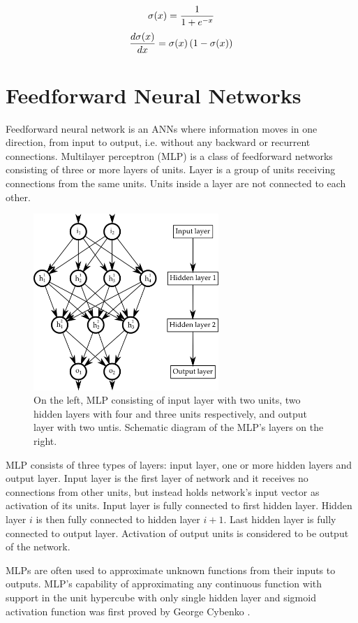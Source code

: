 \documentclass[12pt,oneside]{fithesis2}
\begin{document}
$$\sigma(x) = {1 \over {1 + e^{-x}}}$$
$${{d\sigma(x)} \over dx} = \sigma(x)  \left(1 - \sigma(x)\right)$$

\section{Feedforward Neural Networks}
Feedforward neural network is an ANNs where information moves in one direction, from input to output, i.e. without any backward or recurrent connections. Multilayer perceptron (MLP) is a class of feedforward networks consisting of three or more layers of units. Layer is a group of units receiving connections from the same units. Units inside a layer are not connected to each other. \par
	\begin{figure}[ht]
		\centering
		\includegraphics[width=265px]{mlp.png}
		\caption{On the left, MLP consisting of input layer with two units, two hidden layers with four and three units respectively, and output layer with two untis. Schematic diagram of the MLP's layers on the right.}
	\end{figure}
MLP consists of three types of layers: input layer, one or more hidden layers and output layer. Input layer is the first layer of network and it receives no connections from other units, but instead holds network's input vector as activation of its units. Input layer is fully connected to first hidden layer. Hidden layer $i$ is then fully connected to hidden layer $i + 1$. Last hidden layer is fully connected to output layer. Activation of output units is considered to be output of the network. \par
MLPs are often used to approximate unknown functions from their inputs to outputs. MLP's capability of approximating any continuous function with support in the unit hypercube with only single hidden layer and sigmoid activation function was first proved by George Cybenko \cite{universal-approx-theorem}.
\end{document}
